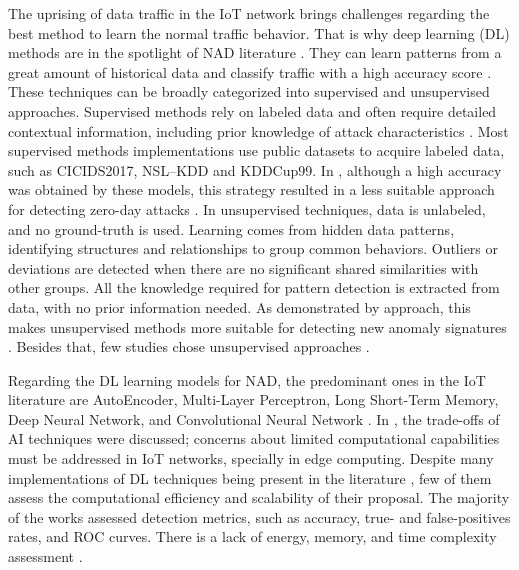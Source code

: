 The uprising of data traffic in the IoT network brings challenges regarding the best method to learn the normal traffic behavior. That is why deep learning (DL) methods are in the spotlight of NAD literature \cite{anis:2025, tsimenidis:2022}. They can learn patterns from a great amount of historical data and classify traffic with a high accuracy score \cite{barnawi:2023}. These techniques can be broadly categorized into supervised and unsupervised approaches. Supervised methods rely on labeled data and often require detailed contextual information, including prior knowledge of attack characteristics \cite{sharma:2025, miguel:2026}. Most supervised methods implementations use public datasets to acquire labeled data, such as CICIDS2017, NSL–KDD and KDDCup99. In \cite{elnakib:2023, toupas:2019, ge:2019}, although a high accuracy was obtained by these models, this strategy resulted in a less suitable approach for detecting zero-day attacks \cite{miguel:2026}. In unsupervised techniques, data is unlabeled, and no ground-truth is used. Learning comes from hidden data patterns, identifying structures and relationships to group common behaviors. Outliers or deviations are detected when there are no significant shared similarities with other groups. All the knowledge required for pattern detection is extracted from data, with no prior information needed. As demonstrated by \cite{hussain:2024} approach, this makes unsupervised methods more suitable for detecting new anomaly signatures \cite{sharma:2025, miguel:2026}. Besides that, few studies chose unsupervised approaches \cite{hussain:2024}.


Regarding the DL learning models for NAD, the predominant ones in the IoT literature are AutoEncoder, Multi-Layer Perceptron, Long Short-Term Memory, Deep Neural Network, and Convolutional Neural Network \cite{elnakib:2023,kalpani:2026}. In \cite{kalpani:2026}, the trade-offs of AI techniques were discussed; concerns about limited computational capabilities must be addressed in IoT networks, specially in edge computing. Despite many implementations of DL techniques being present in the literature \cite{elnakib:2023, toupas:2019, ge:2019, hussain:2020}, few of them assess the computational efficiency and scalability of their proposal. The majority of the works assessed detection metrics, such as accuracy, true- and false-positives rates, and ROC curves. There is a lack of energy, memory, and time complexity assessment \cite{di:2021}.

